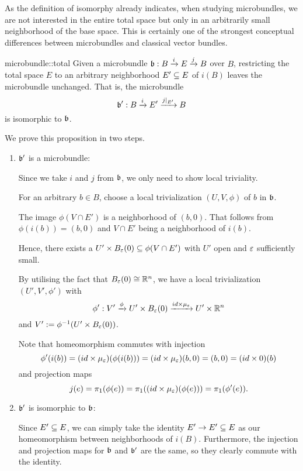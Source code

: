 \begin{myparagraph}
    As the definition of isomorphy already indicates, when studying microbundles,
    we are not interested in the entire total space
    but only in an arbitrarily small neighborhood of the base space.
    This is certainly one of the strongest conceptual differences between microbundles and classical vector bundles.
\end{myparagraph}

\begin{myproposition}{microbundle::total}
    Given a microbundle $\bundledef{\bb}{B}{E}{i}{j}$ over $B$,
    restricting the total space $E$ to an arbitrary neighborhood $E' \sub E$ of $i(B)$ leaves the microbundle unchanged.
    That is, the microbundle
    \[ \bundledef{\bb'}{B}{E'}{i}{j\restr{E'}} \]
    is isomorphic to $\bb$.
\end{myproposition}

\begin{myproof}
    We prove this proposition in two steps.
    \begin{enumerate}
        \item $\bb'$ is a microbundle:
        
        Since we take $i$ and $j$ from $\bb$, we only need to show local triviality.

        For an arbitrary $b \in B$, choose a local trivialization $(U, V, \phi)$ of $b$ in $\bb$.
        
        The image $\phi(V \cap E')$ is a neighborhood of $(b, 0)$.
        That follows from $\phi(i(b)) = (b, 0)$ and $V \cap E'$ being a neighborhood of $i(b)$.

        Hence, there exists a $U' \times \ball[\eps] \sub \phi(V \cap E')$ with $U'$ open and $\eps$ sufficiently small.

        By utilising the fact that $\ball[\eps] \cong \R^n$, we have a local trivialization $(U', V', \phi')$ with
        \[ \phi': V' \xto{\phi} U' \times \ball[\eps] \xto{id \times \mu_\eps} U' \times \R^n \]
        and $V' := \phi^{-1}(U' \times \ball[\eps])$.

        Note that homeomorphism commutes with injection
        \[ \phi'(i(b)) =  (id \times \mu_\eps)(\phi(i(b))) = (id \times \mu_\eps)(b, 0) = (b, 0) = (id \times 0)(b)\]
        and projection maps
        \[ j(e) = \pi_1(\phi(e)) = \pi_1((id \times \mu_\eps)(\phi(e))) = \pi_1(\phi'(e)). \]
        
        \item $\bb'$ is isomorphic to $\bb$:

        Since $E' \sub E$, we can simply take the identity $E' \to E' \sub E$ as our homeomorphism between neighborhoods of $i(B)$.
        Furthermore, the injection and projection maps for $\bb$ and $\bb'$ are the same, so they clearly commute with the identity.
    \end{enumerate}
\end{myproof}